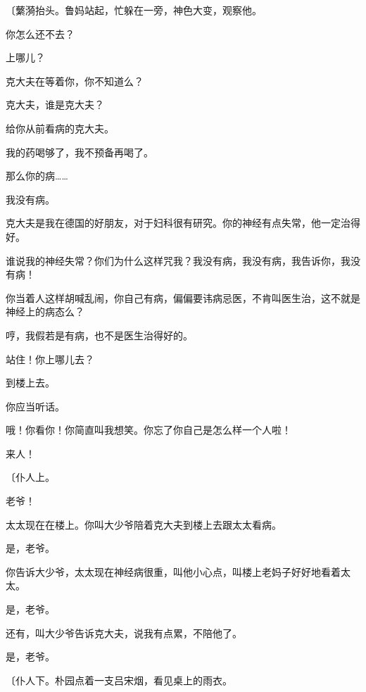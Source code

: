 {\fangsong〔蘩漪抬头。鲁妈站起，忙躲在一旁，神色大变，观察他。}

你怎么还不去？

上哪儿？

克大夫在等着你，你不知道么？

克大夫，谁是克大夫？

给你从前看病的克大夫。

我的药喝够了，我不预备再喝了。

那么你的病……

我没有病。

克大夫是我在德国的好朋友，对于妇科很有研究。你的神经有点失常，他一定治得好。

谁说我的神经失常？你们为什么这样咒我？我没有病，我没有病，我告诉你，我没有病！

你当着人这样胡喊乱闹，你自己有病，偏偏要讳病忌医，不肯叫医生治，这不就是神经上的病态么？

哼，我假若是有病，也不是医生治得好的。

站住！你上哪儿去？

到楼上去。

你应当听话。

哦！你看你！你简直叫我想笑。你忘了你自己是怎么样一个人啦！

来人！

{\fangsong〔仆人上。}

老爷！

太太现在在楼上。你叫大少爷陪着克大夫到楼上去跟太太看病。

是，老爷。

你告诉大少爷，太太现在神经病很重，叫他小心点，叫楼上老妈子好好地看着太太。

是，老爷。

还有，叫大少爷告诉克大夫，说我有点累，不陪他了。

是，老爷。

{\fangsong〔仆人下。朴园点着一支吕宋烟，看见桌上的雨衣。}

